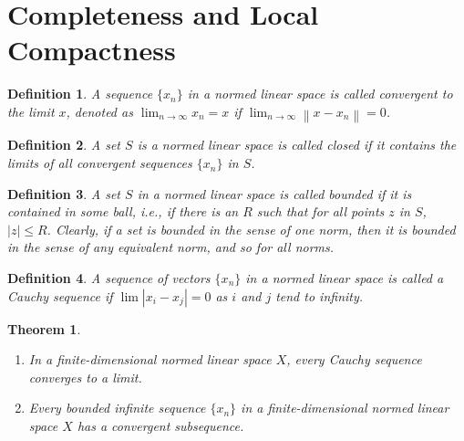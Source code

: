 \documentclass[10pt]{book}
\newtheorem{definition}{Definition}[chapter]
\newtheorem{theorem}{Theorem}[chapter]
\theoremstyle{definition}
\numberwithin{equation}{chapter}
\begin{document}
\medskip

\section{Completeness and Local Compactness}

\begin{definition}
A sequence $\{x_n\}$ in a normed linear space is called convergent to the limit $x$, denoted as $\lim_{n \to \infty} x_n = x$ if $\lim_{n \to \infty} \left\|x - x_n\right\| = 0$.
\end{definition}

\medskip

\begin{definition}
A set $S$ is a normed linear space is called closed if it contains the limits of all convergent sequences $\{x_n\}$ in $S$.
\end{definition}

\medskip

\begin{definition}
A set $S$ in a normed linear space is called bounded if it is contained in some ball, i.e., if there is an $R$ such that for all points $z$ in $S$, $\left|z\right| \leq R$. Clearly, if a set is bounded in the sense of one norm, then it is bounded in the sense of any equivalent norm, and so for all norms.
\end{definition}

\medskip

\begin{definition}
A sequence of vectors $\{x_n\}$ in a normed linear space is called a Cauchy sequence if $\lim \left|x_i - x_j\right| = 0$ as $i$ and $j$ tend to infinity.
\end{definition}

\medskip

\begin{theorem}\label{complete_compact_theorem}
~\begin{enumerate}[label=(\alph*)]
    \item In a finite-dimensional normed linear space $X$, every Cauchy sequence converges to a limit.
    
    \item Every bounded infinite sequence $\{x_n\}$ in a finite-dimensional normed linear space $X$ has a convergent subsequence.
\end{enumerate}
\end{theorem}

\medskip
\end{document}

